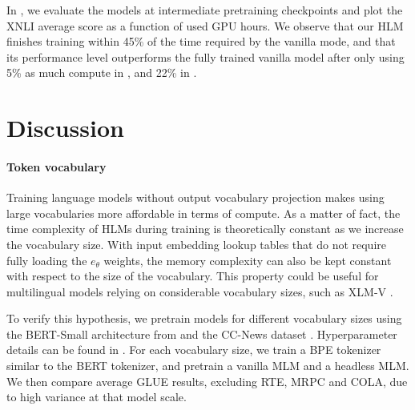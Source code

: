 In , we evaluate the models at intermediate %
pretraining checkpoints
and plot the XNLI average score as a function of used GPU hours. We observe that our HLM finishes training within 45\% of the time required by the vanilla %
mode, and that its performance level outperforms
the fully trained vanilla model after only using 5\% as much compute in , and 22\% in .




\section{Discussion}
\label{sec:discussion}
\paragraph{Token vocabulary} Training language models without output vocabulary projection makes using large vocabularies more affordable in terms of compute. As a matter of fact, the time complexity of HLMs during training is theoretically constant as we increase the vocabulary size. With input embedding lookup tables that do not require fully loading the $e_\theta$ weights, the memory complexity can also be kept constant with respect to the size of the vocabulary. This property could be useful for multilingual models relying on considerable vocabulary sizes, such as XLM-V \citep{2023arXiv230110472L}.

To verify this hypothesis, we pretrain models for different vocabulary sizes using the BERT-Small architecture from \citet{turc2020wellread} and the CC-News dataset \citep{Hamborg2017}. Hyperparameter details can be found in . For each vocabulary size, we train a BPE tokenizer similar to the BERT tokenizer, and pretrain a vanilla MLM and a headless MLM. We then compare average GLUE results, excluding RTE, MRPC and COLA, due to high variance at that model scale.

